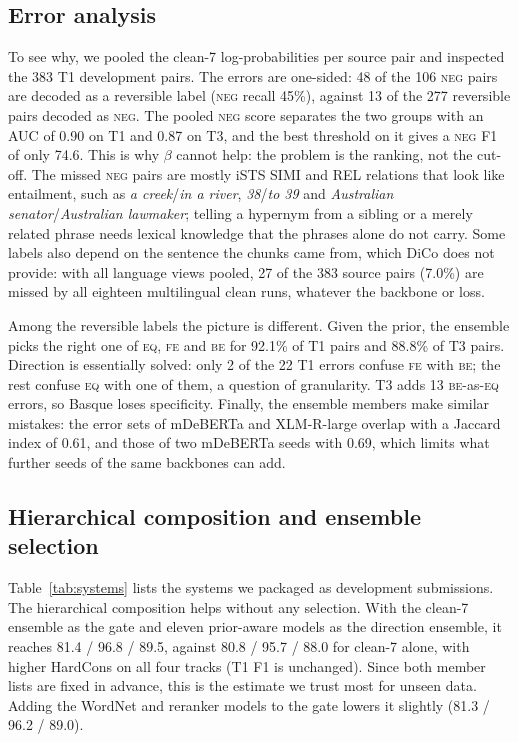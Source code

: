 \documentclass[conference]{IEEEtran}
\newcommand{\EQ}{\textsc{eq}}
\newcommand{\FE}{\textsc{fe}}
\newcommand{\BE}{\textsc{be}}
\newcommand{\NEG}{\textsc{neg}}
\begin{document}
\subsection{Error analysis}
\label{sec:errors}
To see why, we pooled the clean-7 log-probabilities per source pair and
inspected the 383 T1 development pairs. The errors are one-sided: 48 of the 106
\NEG{} pairs are decoded as a reversible label (\NEG{} recall 45\%), against 13
of the 277 reversible pairs decoded as \NEG. The pooled \NEG{} score separates
the two groups with an AUC of 0.90 on T1 and 0.87 on T3, and the best
threshold on it gives a \NEG{} F1 of only 74.6. This is why $\beta$ cannot
help: the problem is the ranking, not the cut-off. The missed \NEG{} pairs are
mostly iSTS SIMI and REL relations that look like entailment, such as
\emph{a creek}/\emph{in a river}, \emph{38}/\emph{to 39} and
\emph{Australian senator}/\emph{Australian lawmaker}; telling a hypernym from a
sibling or a merely related phrase needs lexical knowledge that the phrases
alone do not carry. Some labels also depend on the sentence the chunks came
from, which DiCo does not provide: with all language views pooled, 27 of the
383 source pairs (7.0\%) are missed by all eighteen multilingual clean runs,
whatever the backbone or loss.

Among the reversible labels the picture is different. Given the prior, the
ensemble picks the right one of \EQ, \FE{} and \BE{} for 92.1\% of T1 pairs
and 88.8\% of T3 pairs. Direction is essentially solved: only 2 of the 22 T1
errors confuse \FE{} with \BE; the rest confuse \EQ{} with one of them, a
question of granularity. T3 adds 13 \BE-as-\EQ{} errors, so Basque loses
specificity. Finally, the ensemble members make similar mistakes: the error
sets of mDeBERTa and XLM-R-large overlap with a Jaccard index of 0.61, and
those of two mDeBERTa seeds with 0.69, which limits what further seeds of the
same backbones can add.



\subsection{Hierarchical composition and ensemble selection}
\label{sec:hierresults}
Table~\ref{tab:systems} lists the systems we packaged as development
submissions. The hierarchical composition helps without any selection. With
the clean-7 ensemble as the gate and eleven prior-aware models as the direction
ensemble, it reaches 81.4 / 96.8 / 89.5, against 80.8 / 95.7 / 88.0 for
clean-7 alone, with higher HardCons on all four tracks (T1 F1 is unchanged). Since both member lists are fixed
in advance, this is the estimate we trust most for unseen data. Adding the
WordNet and reranker models to the gate lowers it slightly (81.3 / 96.2 /
89.0).
\end{document}
